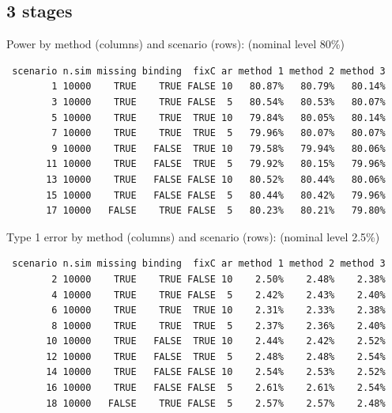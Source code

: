 \documentclass[12pt]{article}
\begin{document}
\clearpage

\subsection{3 stages}
\label{sec:orgd16dfac}

Power by method (columns) and scenario (rows): \hfill (nominal level 80\%)
\begin{verbatim}
 scenario n.sim missing binding  fixC ar method 1 method 2 method 3
        1 10000    TRUE    TRUE FALSE 10   80.87%   80.79%   80.14%
        3 10000    TRUE    TRUE FALSE  5   80.54%   80.53%   80.07%
        5 10000    TRUE    TRUE  TRUE 10   79.84%   80.05%   80.14%
        7 10000    TRUE    TRUE  TRUE  5   79.96%   80.07%   80.07%
        9 10000    TRUE   FALSE  TRUE 10   79.58%   79.94%   80.06%
       11 10000    TRUE   FALSE  TRUE  5   79.92%   80.15%   79.96%
       13 10000    TRUE   FALSE FALSE 10   80.52%   80.44%   80.06%
       15 10000    TRUE   FALSE FALSE  5   80.44%   80.42%   79.96%
       17 10000   FALSE    TRUE FALSE  5   80.23%   80.21%   79.80%
\end{verbatim}


\bigskip

Type 1 error by method (columns) and scenario (rows): \hfill (nominal level 2.5\%)
\begin{verbatim}
 scenario n.sim missing binding  fixC ar method 1 method 2 method 3
        2 10000    TRUE    TRUE FALSE 10    2.50%    2.48%    2.38%
        4 10000    TRUE    TRUE FALSE  5    2.42%    2.43%    2.40%
        6 10000    TRUE    TRUE  TRUE 10    2.31%    2.33%    2.38%
        8 10000    TRUE    TRUE  TRUE  5    2.37%    2.36%    2.40%
       10 10000    TRUE   FALSE  TRUE 10    2.44%    2.42%    2.52%
       12 10000    TRUE   FALSE  TRUE  5    2.48%    2.48%    2.54%
       14 10000    TRUE   FALSE FALSE 10    2.54%    2.53%    2.52%
       16 10000    TRUE   FALSE FALSE  5    2.61%    2.61%    2.54%
       18 10000   FALSE    TRUE FALSE  5    2.57%    2.57%    2.48%
\end{verbatim}

\clearpage
\end{document}
